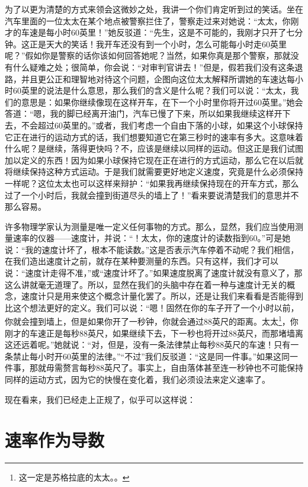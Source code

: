 \documentclass[12pt,oneside]{book}
\begin{document}
\begin{common-format}
为了以更为清楚的方式来领会这微妙之处，我讲一个你们肯定听到过的笑话。坐在汽车里面的一位太太在某个地点被警察拦住了，警察走过来对她说：“太太，你刚才的车速是每小时60英里！”她反驳道：“先生，这是不可能的，我刚才只开了七分钟。这正是天大的笑话！我开车还没有到一个小时，怎么可能每小时走60英里呢？”假如你是警察的话你该如何回答她呢？当然，如果你真是那个警察，那就没有什么疑难之处；很简单，你会说：“对审判官讲去！”但是，假若我们没有这条退路，并且更公正和理智地对待这个问题，企图向这位太太解释所谓她的车速达每小时60英里的说法是什么意思，那么我们的含义是什么呢？我们可以说：“太太，我们的意思是：如果你继续像现在这样开车，在下一个小时里你将开过60英里。”她会答道：“嗯，我的脚已经离开油门，汽车已慢了下来，所以如果我继续这样开下去，不会超过60英里的。”或者，我们考虑一个自由下落的小球，如果这个小球保持它正在进行的运动方式的话，我们想要知道它在第三秒时的速率有多大。这意味着什么呢？是继续，落得更快吗？不，应该是继续以同样的运动。但这正是我们试图加以定义的东西！因为如果小球保持它现在正在进行的方式运动，那么它在以后就将继续保持这种方式运动。于是我们就需要更好地定义速度，究竟是什么必须保持一样呢？这位太太也可以这样来辩护：“如果我再继续保持现在的开车方式，那么过了一个小时后，我就会撞到街道尽头的墙上了！”看来要说清楚我们的意思并不那么容易。

许多物理学家认为测量是唯一定义任何事物的方式。那么，显然，我们应当使用测量速率的仪器——速度计，并说：“！太太，你的速度计的读数指到60。”可是她说：“我的速度计坏了，根本不能读数。”这是否表示汽车停着不动呢？我们相信，在我们造出速度计之前，就存在某种要测量的东西。只有这样，我们才可以说：“速度计走得不准，”或“速度计坏了。”如果速度脱离了速度计就没有意义了，那这么讲就毫无道理了。所以，显然在我们的头脑中存在着一种与速度计无关的概念，速度计只是用来使这个概念计量化罢了。所以，还是让我们来看看是否能得到比这个想法更好的定义。我们可以说：“嗯！固然在你的车子开了一个小时以前，你就会撞到墙上，但是如果你开了一秒钟，你就会通过88英尺的距离。太太\footnote{这一定是苏格拉底的太太。。}，你刚才的车速正是每秒88英尺，如果继续下去，下一秒也将开过88英尺，而那堵墙离这还远着呢。”她就说：“对，但是，没有一条法律禁止每秒88英尺的车速！只有一条禁止每小时开60英里的法律。”“不过”我们反驳道：“这是同一件事。”如果这同一件事，那就毋需赘言每秒88英尺了。事实上，自由落体甚至连一秒钟也不可能保持同样的运动方式，因为它的快慢在变化着，我们必须设法来定义速率了。

现在看来，我们已经走上正规了，似乎可以这样说：

\section{速率作为导数}


\end{common-format}
\end{document}

